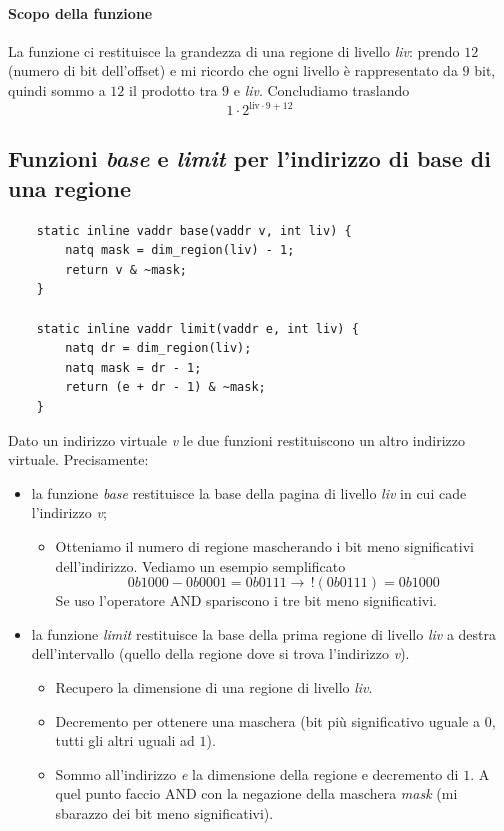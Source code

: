 \paragraph{Scopo della funzione} La funzione ci restituisce la grandezza di una regione di livello \emph{liv}: prendo $12$ (numero di bit dell'offset) e mi ricordo che ogni livello è rappresentato da $9$ bit, quindi sommo a $12$ il prodotto tra $9$ e \emph{liv}. Concludiamo traslando
\[1 \cdot 2^{\text{liv} \cdot 9 + 12}\]

\subsection{Funzioni \emph{base} e \emph{limit} per l'indirizzo di base di una regione}
\small 
\begin{verbatim}
	static inline vaddr base(vaddr v, int liv) {
		natq mask = dim_region(liv) - 1;
		return v & ~mask;
	}
	
	static inline vaddr limit(vaddr e, int liv) {
		natq dr = dim_region(liv);
		natq mask = dr - 1;
		return (e + dr - 1) & ~mask;
	}
\end{verbatim}
\normalsize 
Dato un indirizzo virtuale \emph{v} le due funzioni restituiscono un altro indirizzo virtuale. Precisamente:
\begin{itemize}
	\item la funzione \emph{base} restituisce la base della pagina di livello \emph{liv} in cui cade l'indirizzo \emph{v};
	\begin{itemize}
		\item Otteniamo il numero di regione mascherando i bit meno significativi dell'indirizzo. Vediamo un esempio semplificato
		\[0b1000 - 0b0001 = 0b0111 \longrightarrow \,!(0b0111)=0b1000\]
		Se uso l'operatore AND spariscono i tre bit meno significativi.
	\end{itemize}
	\item la funzione \emph{limit} restituisce la base della prima regione di livello \emph{liv} a destra dell'intervallo (quello della regione dove si trova l'indirizzo \emph{v}).
	\begin{itemize}
		\item Recupero la dimensione di una regione di livello \emph{liv}.
		\item  Decremento per ottenere una maschera (bit più significativo uguale a $0$, tutti gli altri uguali ad $1$).
		\item Sommo all'indirizzo \emph{e} la dimensione della regione e decremento di $1$. A quel punto faccio AND con la negazione della maschera \emph{mask} (mi sbarazzo dei bit meno significativi).
	\end{itemize}
\end{itemize}

